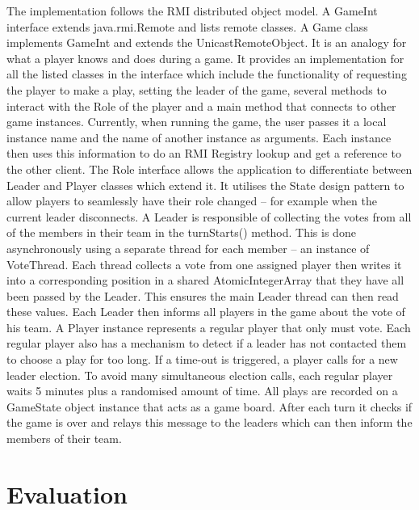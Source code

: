 \documentclass[conference]{IEEEtran}
\begin{document}
The implementation follows the RMI distributed object model. A GameInt interface extends java.rmi.Remote and lists remote classes. 
A Game class implements GameInt and extends the UnicastRemoteObject. It is an analogy for what a player knows and does during a game. 
It provides an implementation for all the listed classes in the interface which include the functionality of requesting the player to make a play, 
setting the leader of the game, several methods to interact with the Role of the player and a main method that connects to other game instances. 
Currently, when running the game, the user passes it a local instance name and the name of another instance as arguments. Each instance then uses this information 
to do an RMI Registry lookup and get a reference to the other client. The Role interface allows the application to differentiate between Leader and Player classes which extend it. 
It utilises the State design pattern to allow players to seamlessly have their role changed – for example when the current leader disconnects. 
A Leader is responsible of collecting the votes from all of the members in their team in the turnStarts() method. This is done asynchronously using
a separate thread for each member – an instance of VoteThread. Each thread collects a vote from one assigned player then writes it into a corresponding position
in a shared AtomicIntegerArray that they have all been passed by the Leader. This ensures the main Leader thread can then read these values. 
Each Leader then informs all players in the game about the vote of his team. A Player instance represents a regular player that only must vote. 
Each regular player also has a mechanism to detect if a leader has not contacted them to choose a play for too long. If a time-out is triggered, 
a player calls for a new leader election. To avoid many simultaneous election calls, each regular player waits 5 minutes plus a randomised amount of time.
All plays are recorded on a GameState object instance that acts as a game board. After each turn it checks if the game is over and relays this message to the leaders
 which can then inform the members of their team.
 
 

\section{Evaluation}
\end{document}
